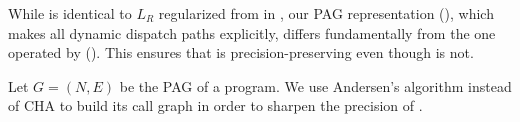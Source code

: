 
While
 \LG is identical to $L_R$ regularized from \manuLF  in \selectx
 \cite{lu2021selective}, our  PAG  representation (), which makes all
 dynamic dispatch paths explicitly, 
differs
 fundamentally  from the one operated by \manuLFC
().
This ensures that \tool is precision-preserving even though
\selectx is not.

\begin{comment}
Given $L_{RC} = L_R \cap L_C$, the necessary condition in \Cref{eqn:cflcscondition} can now be weakened as follows:
\begin{equation}
\label{eqn:cflcsconditionLR}
\begin{split}
    \exists p_{o, n, v}: & L_{R} (p_{o, n, v}) \in L_{R} \\
                         & \wedge L_C(p_{o, n}) \in L_C \wedge L_C(p_{n, v}) \in L_C \\  
                          &  \wedge L_C^{\entry}(p_{o, n}) \neq  \emptyctx \wedge L_C^{\exit}(p_{n, v}) \neq \emptyctx 
\end{split}
\end{equation}
We no longer require $L_C^{\entry}(p_{o, n}) \neq  L_C^{\exit}(p_{n, v})$ as long as they are not \emptyctx.  This simplification would make verification more easier while achieving almost similar verification effect.
\end{comment}

Let $G=(N,E)$ be the PAG of a program. 
We use Andersen's algorithm \cite{andersen1994program} instead of CHA \cite{dean1995optimization} 
to build its  call graph  in order to sharpen the precision of \tool.




